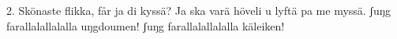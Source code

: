 2.  Skönaste flikka, får ja di kyssä?
    Ja ska varä höveli u lyftä pa me myssä.
    ʃuŋg farallalallalalla uŋgdoumen!
    ʃuŋg farallalallalalla käleiken!
